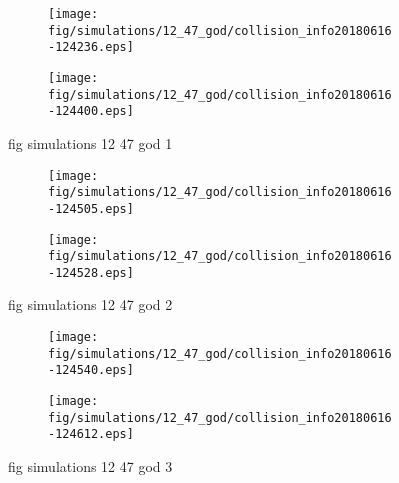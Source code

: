 \begin{figure}[H]
	\centering
	\begin{subfigure}[b]{0.8\textwidth}
		\texttt{[image: fig/simulations/12\_47\_god/collision\_info20180616-124236.eps]}
		\caption{}
		\label{fig:simulations:12_47_god:collision_info20180616-124236}
	\end{subfigure}

	\begin{subfigure}[b]{0.8\textwidth}
		\texttt{[image: fig/simulations/12\_47\_god/collision\_info20180616-124400.eps]}
		\caption{}
		\label{fig:simulations:12_47_god:collision_info20180616-124400}
	\end{subfigure}
	\caption{fig simulations 12 47 god 1}
	\label{fig:simulations:12_47_god:1}
\end{figure}

\begin{figure}[H]
	\centering
	\begin{subfigure}[b]{0.8\textwidth}
		\texttt{[image: fig/simulations/12\_47\_god/collision\_info20180616-124505.eps]}
		\caption{}
		\label{fig:simulations:12_47_god:collision_info20180616-124505}
	\end{subfigure}

	\begin{subfigure}[b]{0.8\textwidth}
		\texttt{[image: fig/simulations/12\_47\_god/collision\_info20180616-124528.eps]}
		\caption{}
		\label{fig:simulations:12_47_god:collision_info20180616-124528}
	\end{subfigure}
	\caption{fig simulations 12 47 god 2}
	\label{fig:simulations:12_47_god:2}
\end{figure}

\begin{figure}[H]
	\centering
	\begin{subfigure}[b]{0.8\textwidth}
		\texttt{[image: fig/simulations/12\_47\_god/collision\_info20180616-124540.eps]}
		\caption{}
		\label{fig:simulations:12_47_god:collision_info20180616-124540}
	\end{subfigure}

	\begin{subfigure}[b]{0.8\textwidth}
		\texttt{[image: fig/simulations/12\_47\_god/collision\_info20180616-124612.eps]}
		\caption{}
		\label{fig:simulations:12_47_god:collision_info20180616-124612}
	\end{subfigure}
	\caption{fig simulations 12 47 god 3}
	\label{fig:simulations:12_47_god:3}
\end{figure}

